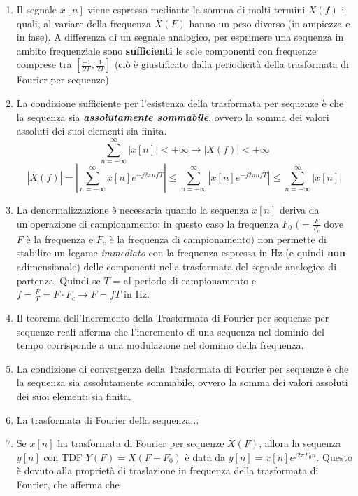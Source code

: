 \documentclass[
]{article}
\begin{document}
\begin{enumerate}
\def\labelenumi{\arabic{enumi}.}
\setcounter{enumi}{5}
\item
  Il segnale \(x[n]\) viene espresso mediante la somma di molti termini
  \(X(f)\) i quali, al variare della frequenza \(\overline{X}(F)\) hanno
  un peso diverso (in ampiezza e in fase). A differenza di un segnale
  analogico, per esprimere una sequenza in ambito frequenziale sono
  \textbf{sufficienti} le sole componenti con frequenze comprese tra
  \([\frac{-1}{2T}, \frac{1}{2T}]\) (ciò è giustificato dalla
  periodicità della trasformata di Fourier per sequenze)
\item
  La condizione sufficiente per l'esistenza della trasformata per
  sequenze è che la sequenza sia \textbf{\emph{assolutamente
  sommabile}}, ovvero la somma dei valori assoluti dei suoi elementi sia
  finita.
  \[\displaystyle \sum_{n=-\infty}^{\infty} |x[n]| < + \infty \to |X(f)| < +\infty\]
  \[|\overline{X}(f)| = |\sum_{n=-\infty}^{\infty} x[n] e^{-j2\pi nfT}| \leq \sum_{n=-\infty}^{\infty} | x[n] e^{-j2\pi nfT}| \leq 
    \sum_{n=-\infty}^{\infty} |x[n]|\]
\item
  La denormalizzazione è necessaria quando la sequenza \(x[n]\) deriva
  da un'operazione di campionamento: in questo caso la frequenza \(F_0\)
  \((= \frac{F}{F_c}\) dove \(F\) è la frequenza e \(F_c\) è la
  frequenza di campionamento\()\) non permette di stabilire un legame
  \emph{immediato} con la frequenza espressa in Hz (e quindi
  \textbf{non} adimensionale) delle componenti nella trasformata del
  segnale analogico di partenza. Quindi se \(T\) = al periodo di
  campionamento e \(f=\frac{F}{T}=F\cdot F_c \to F=fT\) in Hz.
\item
  Il teorema dell'Incremento della Trasformata di Fourier per sequenze
  per sequenze reali afferma che l'incremento di una sequenza nel
  dominio del tempo corrisponde a una modulazione nel dominio della
  frequenza.
\item
  La condizione di convergenza della Trasformata di Fourier per sequenze
  è che la sequenza sia assolutamente sommabile, ovvero la somma dei
  valori assoluti dei suoi elementi sia finita.
\item
  \st{La trasformata di Fourier della sequenza...}
\item
  Se \(x[n]\) ha trasformata di Fourier per sequenze \(X(F)\), allora la
  sequenza \(y[n]\) con TDF \(Y(F)=X(F-F_0)\) è data da
  \(y[n]=x[n]e^{j2\pi F_0n}\). Questo è dovuto alla proprietà di
  traslazione in frequenza della trasformata di Fourier, che afferma che

\end{enumerate}
\end{document}
